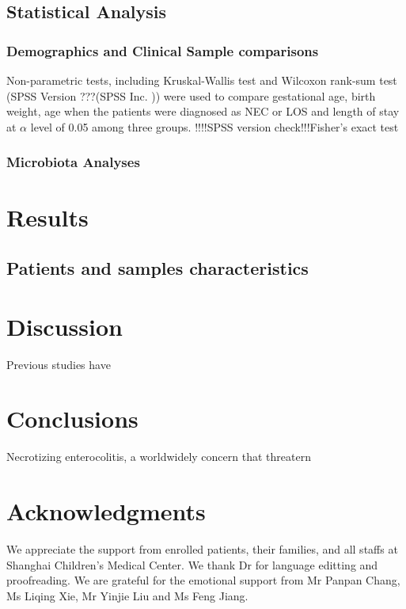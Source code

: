 \documentclass[fleqn,10pt,lineno]{wlpeerj} %
\begin{document}
  \subsection*{Statistical Analysis}
    \subsubsection{Demographics and Clinical Sample comparisons}
    Non-parametric tests, including Kruskal-Wallis test and Wilcoxon rank-sum test (SPSS Version ???(SPSS Inc. )) were used to compare gestational age, birth weight, age when the patients were diagnosed as NEC or LOS and length of stay at $\alpha$ level of 0.05 among three groups. !!!!SPSS version check!!!Fisher’s exact test
    \subsubsection{Microbiota Analyses}





\section*{Results}
\subsection*{Patients and samples characteristics}

\section*{Discussion}
Previous studies have



\section*{Conclusions}
Necrotizing enterocolitis,  a worldwidely concern that threatern

\section*{Acknowledgments}
We appreciate the support from enrolled patients, their families, and all staffs at Shanghai Children’s Medical Center. We thank Dr for language editting and proofreading. We are grateful for the emotional support from Mr Panpan Chang, Ms Liqing Xie, Mr Yinjie Liu and Ms Feng Jiang.


\end{document}
